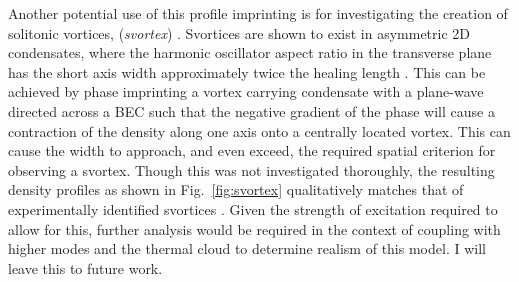 Another potential use of this profile imprinting is for investigating the creation of solitonic vortices, (\textit{svortex}) \cite{}. Svortices are shown to exist in asymmetric 2D condensates, where the harmonic oscillator aspect ratio in the transverse plane has the short axis width approximately twice the healing length \cite{}. This can be achieved by phase imprinting a vortex carrying condensate with a plane-wave directed across a BEC such that the negative gradient of the phase will cause a contraction of the density along one axis onto a centrally located vortex. This can cause the width to approach, and even exceed, the required spatial criterion for observing a svortex. Though this was not investigated thoroughly, the resulting density profiles as shown in Fig.~\ref{fig:svortex} qualitatively matches that of experimentally identified svortices \cite{}. Given the strength of excitation required to allow for this, further analysis would be required in the context of coupling with higher modes and the thermal cloud to determine realism of this model. I will leave this to future work.

